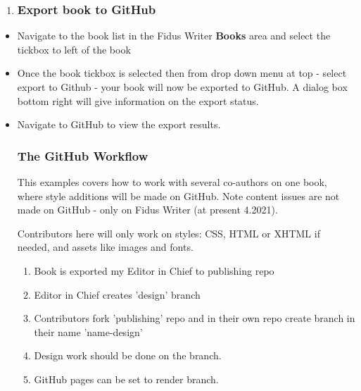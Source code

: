 \documentclass{article}
\begin{document}
\begin{enumerate}[start=3]
\item \subsubsection{Export book to GitHub}\label{H6727539}



\end{enumerate}
\begin{itemize}
\item Navigate to the book list in the Fidus Writer \textbf{Books} area and select the tickbox to left of the book


\item Once the book tickbox is selected then from drop down menu at top - select export to Github - your book will now be exported to GitHub. A dialog box bottom right will give information on the export status.


\item Navigate to GitHub to view the export results.


\subsubsection{The GitHub Workflow}\label{H5994203}



This examples covers how to work with several co-authors on one book, where style additions will be made on GitHub. Note content issues are not made on GitHub - only on Fidus Writer (at present 4.2021).


Contributors here will only work on styles: CSS, HTML or XHTML if needed, and assets like images and fonts.

\begin{enumerate}
\item Book is exported my Editor in Chief to publishing repo


\item Editor in Chief creates 'design' branch


\item Contributors fork 'publishing' repo and in their own repo create branch in their name 'name-design'


\item Design work should be done on the branch.


\item GitHub pages can be set to render branch.



\end{enumerate}
\end{itemize}
\end{document}
